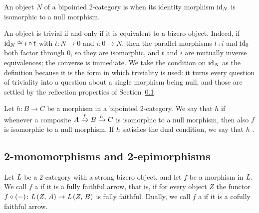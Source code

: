 \begin{definition}
  \label{Def Trivial}  \leanok
  An object \(N\) of a bipointed 2-category is  when its identity morphism \(\operatorname{id}_{N}\) is isomorphic to a null morphism.
\end{definition}

\begin{remark}
  \label{Rem Trivial}
  An object is trivial if and only if it is equivalent to a bizero object. Indeed, if \(\operatorname{id}_{N}\cong i\circ t\) with \(t\colon N\to 0\) and \(i\colon 0\to N\), then the parallel morphisms \(t\comp i\) and \(\operatorname{id}_{0}\) both factor through \(0\), so they are isomorphic, and \(t\) and \(i\) are mutually inverse equivalences; the converse is immediate. We take the condition on \(\operatorname{id}_{N}\) as the definition because it is the form in which triviality is used: it turns every question of triviality into a question about a single morphism being null, and those are settled by the reflection properties of Section~\ref{SS:Monos}.
\end{remark}

\begin{definition}
  \label{Def Reflects Null}   \leanok
  Let \(h\colon B\to C\) be a morphism in a bipointed 2-category. We say that \(h\)  if whenever a composite \(A\xrightarrow[]{f}B\xrightarrow[]{h}C\) is isomorphic to a null morphism, then also \(f\) is isomorphic to a null morphism. If \(h\) satisfies the dual condition, we say that \(h\) .
\end{definition}

\subsection{2-monomorphisms and 2-epimorphisms}\label{SS:Monos}

\begin{definition}
  \label{Def Mono}  \leanok
  Let \(\mathit{L}\) be a 2-category with a strong bizero object, and let \(f\) be a morphism in \(\mathit{L}\). We call \(f\) a  if it is a fully faithful arrow, that is, if for every object \(Z\) the functor \(f\circ(-)\colon{\ensuremath{\mathit{L}}}\left({Z},\,{A}\right)\to{\ensuremath{\mathit{L}}}\left({Z},\,{B}\right)\) is fully faithful. Dually, we call \(f\) a  if it is a cofully faithful arrow.
\end{definition}

